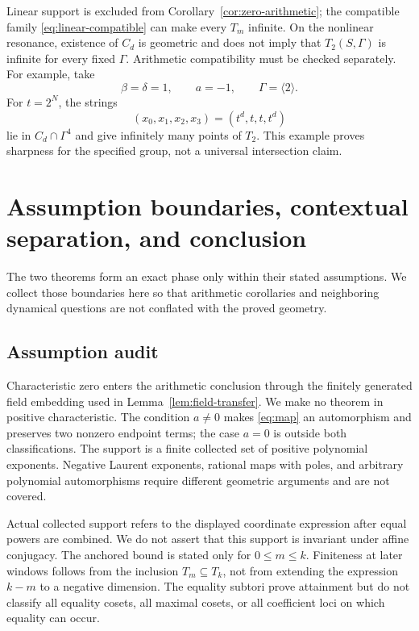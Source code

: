 \documentclass[11pt]{article}
\theoremstyle{definition}
\theoremstyle{remark}
\newcommand{\Gam}{\Gamma}
\begin{document}
Linear support is excluded from Corollary~\ref{cor:zero-arithmetic}; the compatible family \eqref{eq:linear-compatible} can make every $T_m$ infinite.  On the nonlinear resonance, existence of $C_d$ is geometric and does not imply that $T_2(S,\Gam)$ is infinite for every fixed $\Gam$.  Arithmetic compatibility must be checked separately.  For example, take
\begin{equation}
\beta=\delta=1,\qquad a=-1,\qquad \Gam=\langle2\rangle.
\label{eq:resonant-data}
\end{equation}
For $t=2^N$, the strings
\begin{equation}
(x_0,x_1,x_2,x_3)=(t^d,t,t,t^d)
\label{eq:resonant-tuple}
\end{equation}
lie in $C_d\cap\Gam^4$ and give infinitely many points of $T_2$.  This example proves sharpness for the specified group, not a universal intersection claim.

\section{Assumption boundaries, contextual separation, and conclusion}
\label{sec:boundaries}

The two theorems form an exact phase only within their stated assumptions.  We collect those boundaries here so that arithmetic corollaries and neighboring dynamical questions are not conflated with the proved geometry.

\subsection{Assumption audit}

Characteristic zero enters the arithmetic conclusion through the finitely generated field embedding used in Lemma~\ref{lem:field-transfer}.  We make no theorem in positive characteristic.  The condition $a\neq0$ makes \eqref{eq:map} an automorphism and preserves two nonzero endpoint terms; the case $a=0$ is outside both classifications.  The support is a finite collected set of positive polynomial exponents.  Negative Laurent exponents, rational maps with poles, and arbitrary polynomial automorphisms require different geometric arguments and are not covered.

Actual collected support refers to the displayed coordinate expression after equal powers are combined.  We do not assert that this support is invariant under affine conjugacy.  The anchored bound is stated only for $0\leq m\leq k$.  Finiteness at later windows follows from the inclusion $T_m\subseteq T_k$, not from extending the expression $k-m$ to a negative dimension.  The equality subtori prove attainment but do not classify all equality cosets, all maximal cosets, or all coefficient loci on which equality can occur.
\end{document}
